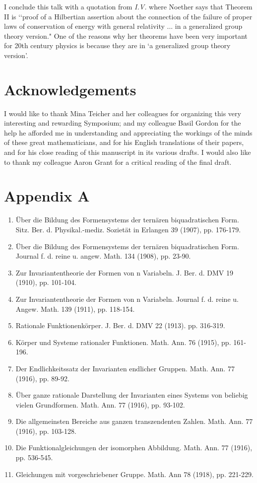 \documentclass[12pt]{article}
\begin{document}
I conclude this talk with a quotation from {\it{I.V.}} where
    Noether says that  Theorem II is  \lq\lq  proof
of a Hilbertian assertion about the connection of the failure of
proper laws of conservation of energy with general relativity ... in
a generalized
group theory version."  One of the reasons why her theorems have been very important for 20th century  physics is because they are in `a generalized group theory version'.

\section*{Acknowledgements}
I would like to thank Mina Teicher and her colleagues for organizing this very interesting and rewarding Symposium; and my colleague Basil Gordon for the help he afforded me in understanding and appreciating the workings of the minds of these
great mathematicians, and for his English translations of their papers,
and for his close reading of this manuscript in its various drafts. 
I would also like to thank my colleague Aaron Grant for a critical reading of
the final draft.
\newpage

\section*{Appendix A}

\begin{enumerate}
\item{} \"Uber die Bildung des Formensystems der tern\"aren 
biquadratischen Form.
  Sitz. Ber. d. Physikal.-mediz. Soziet\"at in Erlangen 39
 (1907), pp. 176-179.
\item{}  \"Uber die Bildung des Formensystems der tern\"aren 
biquadratischen Form.
   Journal f. d. reine u. angew. Math. 134 (1908),
 pp. 23-90.
\item{} Zur Invariantentheorie der Formen von n Variabeln.
  J. Ber. d. DMV 19 (1910), pp. 101-104.
\item{} Zur Invariantentheorie der Formen von n Variabeln.
  Journal f. d. reine u. Angew. Math. 139 (1911), pp. 118-154.
\item{} Rationale Funktionenk\"orper.
J. Ber. d. DMV 22 (1913). pp. 316-319.
\item{} K\"orper und Systeme rationaler Funktionen.
  Math. Ann. 76 (1915), pp. 161-196.
\item{} Der Endlichkeitssatz der Invarianten endlicher Gruppen.
  Math. Ann. 77 (1916), pp. 89-92.
\item{} \"Uber ganze rationale Darstellung der Invarianten
 eines Systems von beliebig vielen Grundformen.
  Math. Ann. 77 (1916), pp. 93-102. 
 \item{} Die allgemeinsten Bereiche aus ganzen 
 transzendenten Zahlen.
  Math. Ann. 77 (1916), pp. 103-128. 
 \item{} Die Funktionalgleichungen der isomorphen Abbildung.
  Math. Ann. 77 (1916), pp. 536-545.
 \item{} Gleichungen mit vorgeschriebener Gruppe.
  Math. Ann 78 (1918), pp. 221-229. 

\end{enumerate}
\newpage
\end{document}
